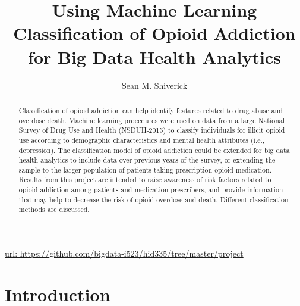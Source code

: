 \documentclass[sigconf]{acmart}
\begin{document}
\title{Using Machine Learning Classification of Opioid Addiction
for Big Data Health Analytics}

  \author{Sean M. Shiverick}

\renewcommand{\shortauthors}{S.M. Shiverick}


\begin{abstract}
Classification of opioid addiction can help identify features related to 
drug abuse and overdose death. Machine learning procedures were used on data 
from a large National Survey of Drug Use and Health (NSDUH-2015) to classify 
individuals for illicit opioid use according to demographic characteristics 
and mental health attributes (i.e., depression). The classification model of 
opioid addiction could be extended for big data health analytics to include 
data over previous years of the survey, or extending the sample to the larger 
population of patients taking prescription opioid medication. Results from  
this project are intended to raise awareness of risk factors related to 
opioid addiction among patients and medication prescribers, and provide 
information that may help to decrease the risk of opioid overdose and death. 
Different classification methods are discussed.

\end{abstract}


\maketitle

\url{url: https://github.com/bigdata-i523/hid335/tree/master/project}

\section{Introduction}
\end{document}
